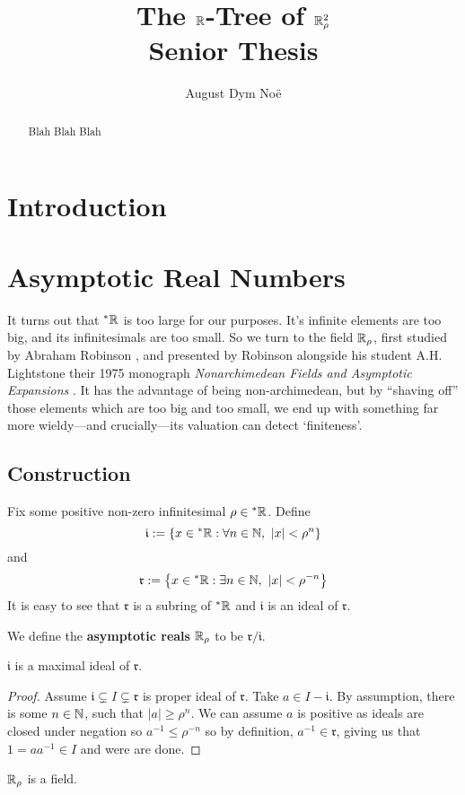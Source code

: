 \documentclass[draft]{amsart}
\title[The \(\R\)-Tree of \(\R_\rho^2\)]{The \(\R\)-Tree of \(\R_\rho^2\) \\ Senior Thesis}
\author{August Dym Noë}
\begin{document}
\begin{abstract}
Blah Blah Blah
    \tableofcontents
\end{abstract}
\maketitle



\section{Introduction}
\section{Asymptotic Real Numbers}
    It turns out that \(^*\mathbb{R}\) is too large for our purposes. It's infinite elements are too big, and its infinitesimals are too small. So we turn to the field \(\mathbb{R}_\rho\), first studied by Abraham Robinson \cite{ARobinson1973}, and presented by Robinson alongside his student A.H. Lightstone their 1975 monograph  \textit{Nonarchimedean Fields and Asymptotic Expansions} \cite{Lightstone_Robinson_1975}.  It has the advantage of being non-archimedean, but by ``shaving off'' those elements which are too big and too small, we end up with something far more wieldy---and crucially---its valuation can detect `finiteness'. 
\subsection{Construction}
    Fix some positive non-zero infinitesimal \(\rho\in {^*\mathbb{R}}\). Define
    \[\mathfrak{i}:=\set{x\in {^*\R}}{\forall n\in \N,\ |x|<\rho^n}\]
    and
    \[\mathfrak r:=\left\{ x\in {^*\mathbb{R}} : \exists n\in \mathbb{N},\  |x|<\rho^{-n} \right\}\]
    It is easy to see that \(\mathfrak{r}\) is a subring of \(^*\mathbb{R}\) and \(\mathfrak{i}\) is an ideal of \(\mathfrak{r}\).
    \begin{defn}\label{defn:asymptotic-reals}
        We define the \textbf{asymptotic reals} \( \mathbb{R}_\rho \) to be \(\mathfrak r/ \mathfrak i\).
    \end{defn}
    \begin{lemma}\label{lemma:maximal-ideal-m-in-n}\(\mathfrak{i}\) is a maximal ideal of \(\mathfrak{r}\).
    \end{lemma}
    \begin{proof}
            Assume \(\mathfrak i \subsetneq I\subsetneq \mathfrak r\) is proper ideal of \(\mathfrak r\). Take \(a\in I-\mathfrak i\). By assumption, there is some \(n\in \mathbb{N}\), such that \(|a|\ge \rho^n\). We can assume \(a\) is positive as ideals are closed under negation so \(a^{-1}\le \rho^{-n}\) so by definition, \(a^{-1}\in \mathfrak r\), giving us that \(1=aa^{-1}\in I\) and were are done.
        \end{proof}
    \begin{corollary}
    \( \mathbb{R}_\rho \) is a field.
    \end{corollary}
\end{document}
